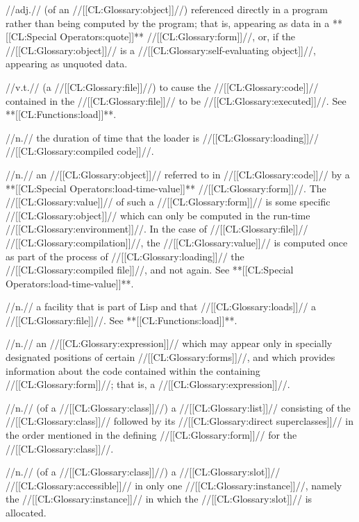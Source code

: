  //adj.// (of an //[[CL:Glossary:object]]//) referenced directly in a program rather than being computed by the program; that is, appearing as data in a **[[CL:Special Operators:quote]]** //[[CL:Glossary:form]]//, or, if the //[[CL:Glossary:object]]// is a //[[CL:Glossary:self-evaluating object]]//, appearing as unquoted data. 

 //v.t.// (a //[[CL:Glossary:file]]//) to cause the //[[CL:Glossary:code]]// contained in the //[[CL:Glossary:file]]// to be //[[CL:Glossary:executed]]//. See **[[CL:Functions:load]]**.

 //n.// the duration of time that the loader is //[[CL:Glossary:loading]]// //[[CL:Glossary:compiled code]]//.

 //n.// an //[[CL:Glossary:object]]// referred to in //[[CL:Glossary:code]]// by a **[[CL:Special Operators:load-time-value]]** //[[CL:Glossary:form]]//. The //[[CL:Glossary:value]]// of such a //[[CL:Glossary:form]]// is some specific //[[CL:Glossary:object]]// which can only be computed in the run-time //[[CL:Glossary:environment]]//. In the case of //[[CL:Glossary:file]]// //[[CL:Glossary:compilation]]//, the //[[CL:Glossary:value]]// is computed once as part of the process of //[[CL:Glossary:loading]]// the //[[CL:Glossary:compiled file]]//, and not again. See **[[CL:Special Operators:load-time-value]]**.

 //n.// a facility that is part of Lisp and that //[[CL:Glossary:loads]]// a //[[CL:Glossary:file]]//. See **[[CL:Functions:load]]**.

 //n.// an //[[CL:Glossary:expression]]// which may appear only in specially designated positions of certain //[[CL:Glossary:forms]]//, and which provides information about the code contained within the containing //[[CL:Glossary:form]]//; that is, a  //[[CL:Glossary:expression]]//.

 //n.// (of a //[[CL:Glossary:class]]//) a //[[CL:Glossary:list]]// consisting of the //[[CL:Glossary:class]]// followed by its //[[CL:Glossary:direct superclasses]]// in the order mentioned in the defining //[[CL:Glossary:form]]// for the //[[CL:Glossary:class]]//.
 
 //n.// (of a //[[CL:Glossary:class]]//) a //[[CL:Glossary:slot]]// //[[CL:Glossary:accessible]]// in only one //[[CL:Glossary:instance]]//, namely the //[[CL:Glossary:instance]]// in which the //[[CL:Glossary:slot]]// is allocated.


